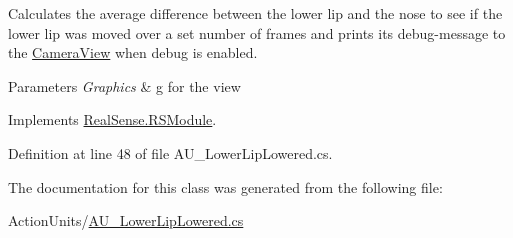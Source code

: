 Calculates the average difference between the lower lip and the nose to see if the lower lip was moved over a set number of frames and prints its\textquotesingle{} debug-\/message to the \hyperlink{class_real_sense_1_1_camera_view}{Camera\+View} when debug is enabled. 
\begin{DoxyParams}{Parameters}
{\em Graphics} & g for the view \\
\hline
\end{DoxyParams}


Implements \hyperlink{class_real_sense_1_1_r_s_module_a2ec830b7932ee7c0077d473f81c73867}{Real\+Sense.\+R\+S\+Module}.



Definition at line 48 of file A\+U\+\_\+\+Lower\+Lip\+Lowered.\+cs.



The documentation for this class was generated from the following file\+:\begin{DoxyCompactItemize}
\item 
Action\+Units/\hyperlink{_a_u___lower_lip_lowered_8cs}{A\+U\+\_\+\+Lower\+Lip\+Lowered.\+cs}\end{DoxyCompactItemize}
